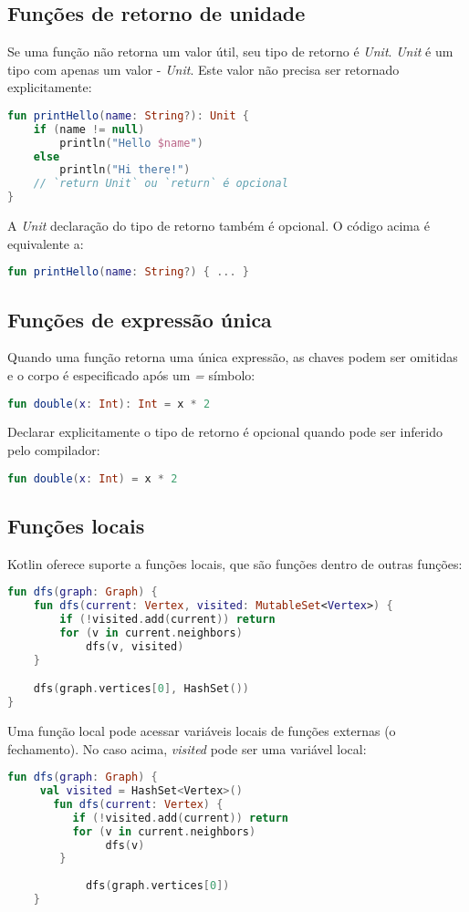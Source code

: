 \subsection{Funções de retorno de unidade}
Se uma função não retorna um valor útil, seu tipo de retorno é \emph{Unit}. \emph{Unit} é um tipo com apenas um valor - \emph{Unit}. Este valor não precisa ser retornado explicitamente:
\begin{lstlisting}[label={lst:example1}, language=Kotlin]
  fun printHello(name: String?): Unit {
    if (name != null)
        println("Hello $name")
    else
        println("Hi there!")
    // `return Unit` ou `return` é opcional
}
       \end{lstlisting}
A \emph{Unit} declaração do tipo de retorno também é opcional. O código acima é equivalente a:
\begin{lstlisting}[label={lst:example1}, language=Kotlin]
        fun printHello(name: String?) { ... }
             \end{lstlisting}

\subsection{Funções de expressão única}
Quando uma função retorna uma única expressão, as chaves podem ser omitidas e o corpo é especificado após um \emph{=} símbolo:
\begin{lstlisting}[label={lst:example1}, language=Kotlin]
 fun double(x: Int): Int = x * 2
       \end{lstlisting}
Declarar explicitamente o tipo de retorno é opcional quando pode ser inferido pelo compilador:      
\begin{lstlisting}[label={lst:example1}, language=Kotlin]
 fun double(x: Int) = x * 2
       \end{lstlisting}

\subsection{Funções locais}
Kotlin oferece suporte a funções locais, que são funções dentro de outras funções:
\begin{lstlisting}[label={lst:example1}, language=Kotlin]
  fun dfs(graph: Graph) {
    fun dfs(current: Vertex, visited: MutableSet<Vertex>) {
        if (!visited.add(current)) return
        for (v in current.neighbors)
            dfs(v, visited)
    }

    dfs(graph.vertices[0], HashSet())
}
        \end{lstlisting}
Uma função local pode acessar variáveis ​​locais de funções externas (o fechamento). No caso acima, \emph{visited} pode ser uma variável local:
\begin{lstlisting}[label={lst:example1}, language=Kotlin]
   fun dfs(graph: Graph) {
     val visited = HashSet<Vertex>()
       fun dfs(current: Vertex) {
          if (!visited.add(current)) return
          for (v in current.neighbors)
               dfs(v)
        }
        
            dfs(graph.vertices[0])
    }
                \end{lstlisting}


